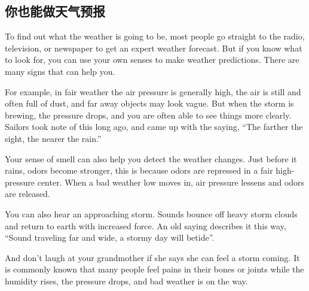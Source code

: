 \subsection{你也能做天气预报}
\begin{margintable}\vspace{-2cm}\footnotesize
\end{margintable}
To find out what the weather is going to be, most people
go straight to the radio, television, or newspaper to get an
expert weather forecast. But if you know what to look
for, you can use your own senses to make weather predictions.
There are many signs that can help you.

For example, in fair weather the air pressure is generally
high, the air is still and often full of dust, and far away objects
may look vague. But when the storm is brewing,
the pressure drops, and you are often able to see things
more clearly. Sailors took note of this long ago, and
came up with the saying, “The farther the sight, the nearer
the rain.”

Your sense of smell can also help you detect the weather
changes. Just before it rains, odors become stronger, this is
because odors are repressed in a fair high-pressure center.
When a bad weather low moves in, air pressure lessens
and odors are released.

You can also hear an approaching storm. Sounds bounce
off heavy storm clouds and return to earth with increased
force. An old saying describes it this way, “Sound
traveling far and wide, a stormy day will betide”.

And don't laugh at your grandmother if she says she can
feel a storm coming. It is commonly known that many
people feel pains in their bones or joints while the humidity
rises, the pressure drops, and bad weather is on the way.